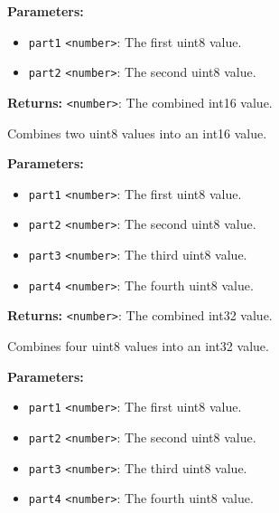 \documentclass[12pt,a4paper]{article}
\begin{document}
\vspace{5mm}
\noindent {}


\noindent \textbf{Parameters:}
\begin{itemize}
  \item \texttt{part1} \texttt{<number>}: The first uint8 value.
  \item \texttt{part2} \texttt{<number>}: The second uint8 value.
\end{itemize}

\noindent \textbf{Returns:} \texttt{<number>}: The combined int16 value.

\noindent Combines two uint8 values into an int16 value.

\vspace{5mm}
\noindent {}


\noindent \textbf{Parameters:}
\begin{itemize}
  \item \texttt{part1} \texttt{<number>}: The first uint8 value.
  \item \texttt{part2} \texttt{<number>}: The second uint8 value.
  \item \texttt{part3} \texttt{<number>}: The third uint8 value.
  \item \texttt{part4} \texttt{<number>}: The fourth uint8 value.
\end{itemize}

\noindent \textbf{Returns:} \texttt{<number>}: The combined int32 value.

\noindent Combines four uint8 values into an int32 value.

\vspace{5mm}
\noindent {}


\noindent \textbf{Parameters:}
\begin{itemize}
  \item \texttt{part1} \texttt{<number>}: The first uint8 value.
  \item \texttt{part2} \texttt{<number>}: The second uint8 value.
  \item \texttt{part3} \texttt{<number>}: The third uint8 value.
  \item \texttt{part4} \texttt{<number>}: The fourth uint8 value.
\end{itemize}
\end{document}
